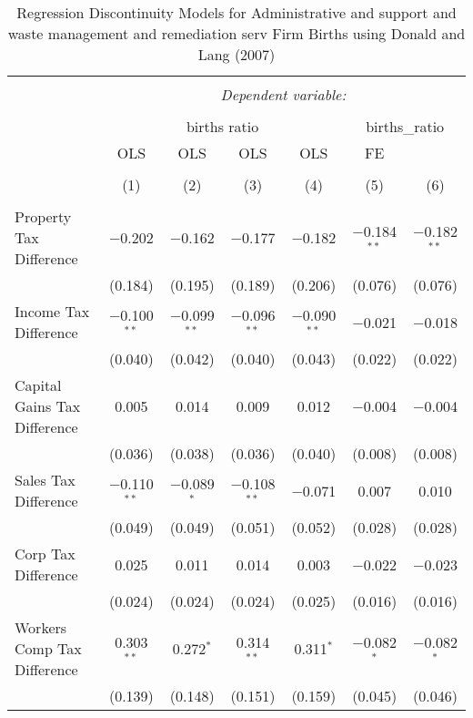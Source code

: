 
\begin{table}[!htbp] \centering 
  \caption{Regression Discontinuity Models for  Administrative and support and waste management and remediation serv Firm Births using Donald and Lang (2007)} 
  \label{} 
\begin{tabular}{@{\extracolsep{5pt}}lcccccc} 
\\[-1.8ex]\hline 
\hline \\[-1.8ex] 
 & \multicolumn{6}{c}{\textit{Dependent variable:}} \\ 
\cline{2-7} 
\\[-1.8ex] & \multicolumn{4}{c}{births ratio} & \multicolumn{2}{c}{births\_ratio} \\ 
 & OLS & OLS & OLS & OLS & FE &  \\ 
\\[-1.8ex] & (1) & (2) & (3) & (4) & (5) & (6)\\ 
\hline \\[-1.8ex] 
 Property Tax Difference & $-$0.202 & $-$0.162 & $-$0.177 & $-$0.182 & $-$0.184$^{**}$ & $-$0.182$^{**}$ \\ 
  & (0.184) & (0.195) & (0.189) & (0.206) & (0.076) & (0.076) \\ 
  Income Tax Difference & $-$0.100$^{**}$ & $-$0.099$^{**}$ & $-$0.096$^{**}$ & $-$0.090$^{**}$ & $-$0.021 & $-$0.018 \\ 
  & (0.040) & (0.042) & (0.040) & (0.043) & (0.022) & (0.022) \\ 
  Capital Gains Tax Difference & 0.005 & 0.014 & 0.009 & 0.012 & $-$0.004 & $-$0.004 \\ 
  & (0.036) & (0.038) & (0.036) & (0.040) & (0.008) & (0.008) \\ 
  Sales Tax Difference & $-$0.110$^{**}$ & $-$0.089$^{*}$ & $-$0.108$^{**}$ & $-$0.071 & 0.007 & 0.010 \\ 
  & (0.049) & (0.049) & (0.051) & (0.052) & (0.028) & (0.028) \\ 
  Corp Tax Difference & 0.025 & 0.011 & 0.014 & 0.003 & $-$0.022 & $-$0.023 \\ 
  & (0.024) & (0.024) & (0.024) & (0.025) & (0.016) & (0.016) \\ 
  Workers Comp Tax Difference & 0.303$^{**}$ & 0.272$^{*}$ & 0.314$^{**}$ & 0.311$^{*}$ & $-$0.082$^{*}$ & $-$0.082$^{*}$ \\ 
  & (0.139) & (0.148) & (0.151) & (0.159) & (0.045) & (0.046) \\ 

\end{tabular}
\end{table}

